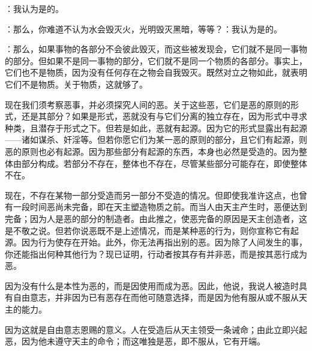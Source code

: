 ：我认为是的。\par

：那么，你难道不认为水会毁灭火，光明毁灭黑暗，等等？：我认为是的。\par

：那么，如果事物的各部分不会彼此毁灭，而这些被发现会，它们就不是同一事物的部分。但如果不是同一事物的部分，它们就不是同一个物质的各部分。事实上，它们也不是物质，因为没有任何存在之物会自我毁灭。既然对立之物如此，就表明它们不是物质。关于物质，这就够了。\par

现在我们须考察恶事，并必须探究人间的恶。关于这些恶，它们是恶的原则的形式，还是其部分？如果是形式，恶就没有与它们分离的独立存在，因为形式中寻求种类，且潜存于形式之下。但若是如此，恶就有起源。因为它的形式显露出有起源——诸如谋杀、奸淫等。但若你愿它们为某一恶的原则的部分，且它们有起源，则恶的原则也必有起源。因为那些部分有起源的东西，本身也必然是受造的。因为整体由部分构成。若部分不存在，整体也不存在，尽管某些部分可能存在，即使整体不在。\par

现在，不存在某物一部分受造而另一部分不受造的情况。但即使我准许这点，也曾有一段时间恶尚未完备，即在天主塑造物质之前。而当人由天主产生时，恶便达到完备；因为人是恶的部分的制造者。由此推之，使恶完备的原因是天主创造者，这是不敬之说。但若你说恶既不是上述情况，而是某种恶的行为，则你宣称它有起源。因为行为使存在开始。此外，你无法再指出别的恶。因为除了人间发生的事，你还能指出何种其他行为？现已证明，行动者按其存有并非恶，而是按其恶行成为恶。\par

因为没有什么是本性为恶的，而是因使用而成为恶。因此，他说，我说人被造时具有自由意志，并非因为已有恶存在而他可随意选择，而是因为他有服从或不服从天主的能力。\par

因为这就是自由意志恩赐的意义。人在受造后从天主领受一条诫命；由此立即兴起恶，因为他未遵守天主的命令；而这唯独是恶，即不服从，它有开端。\par

